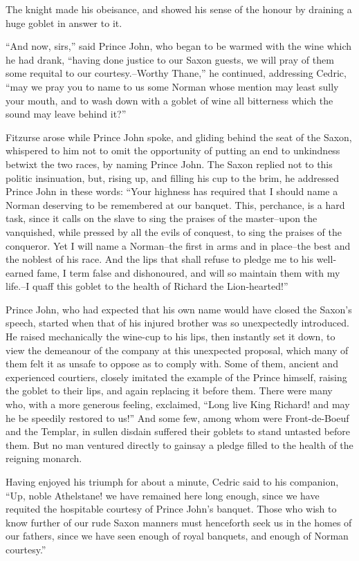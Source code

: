 The knight made his obeisance, and showed his sense of the honour by
draining a huge goblet in answer to it.

``And now, sirs,'' said Prince John, who began to be warmed with the
wine which he had drank, ``having done justice to our Saxon guests, we
will pray of them some requital to our courtesy.--Worthy Thane,'' he
continued, addressing Cedric, ``may we pray you to name to us some
Norman whose mention may least sully your mouth, and to wash down with a
goblet of wine all bitterness which the sound may leave behind it?''

Fitzurse arose while Prince John spoke, and gliding behind the seat of
the Saxon, whispered to him not to omit the opportunity of putting an
end to unkindness betwixt the two races, by naming Prince John. The
Saxon replied not to this politic insinuation, but, rising up, and
filling his cup to the brim, he addressed Prince John in these words:
``Your highness has required that I should name a Norman deserving to be
remembered at our banquet. This, perchance, is a hard task, since it
calls on the slave to sing the praises of the master--upon the
vanquished, while pressed by all the evils of conquest, to sing the
praises of the conqueror. Yet I will name a Norman--the first in arms
and in place--the best and the noblest of his race. And the lips that
shall refuse to pledge me to his well-earned fame, I term false and
dishonoured, and will so maintain them with my life.--I quaff this
goblet to the health of Richard the Lion-hearted!''

Prince John, who had expected that his own name would have closed the
Saxon's speech, started when that of his injured brother was so
unexpectedly introduced. He raised mechanically the wine-cup to his
lips, then instantly set it down, to view the demeanour of the company
at this unexpected proposal, which many of them felt it as unsafe to
oppose as to comply with. Some of them, ancient and experienced
courtiers, closely imitated the example of the Prince himself, raising
the goblet to their lips, and again replacing it before them. There were
many who, with a more generous feeling, exclaimed, ``Long live King
Richard! and may he be speedily restored to us!'' And some few, among
whom were Front-de-Boeuf and the Templar, in sullen disdain suffered
their goblets to stand untasted before them. But no man ventured
directly to gainsay a pledge filled to the health of the reigning
monarch.

Having enjoyed his triumph for about a minute, Cedric said to his
companion, ``Up, noble Athelstane! we have remained here long enough,
since we have requited the hospitable courtesy of Prince John's banquet.
Those who wish to know further of our rude Saxon manners must henceforth
seek us in the homes of our fathers, since we have seen enough of royal
banquets, and enough of Norman courtesy.''

